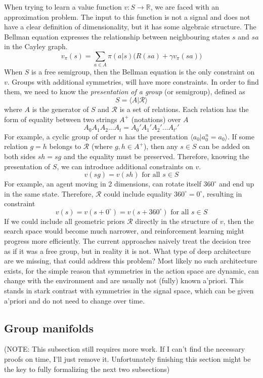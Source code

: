 \documentclass[12pt]{article}
\begin{document}
When trying to learn a value function $v:S\rightarrow \mathbb{R}$, we are faced with an approximation problem. The input to this function is not a signal and does not have a clear definition of dimensionality, but it has some algebraic structure.  The Bellman equation expresses the relationship between neighbouring states $s$ and $sa$ in the Cayley graph.
\[
v_\pi(s) = \sum_{a\in A} \pi(a|s)\big(R(sa)+\gamma v_\pi(sa)\big)
\]
When $S$ is a free semigroup, then the Bellman equation is the only constraint on $v$.
Groups with additional symmetries, will have more constraints. In order to find them, we need to know the \textit{presentation of a group} (or semigroup), defined as
\[
S = \langle A \vert \mathcal{R} \rangle
\]
where $A$ is the generator of $S$ and $\mathcal{R}$ is a set of relations. Each relation has the form of equality between two strings $A^+$ (notations) over $A$
\[
A_0A_1A_2...A_t = A_0'A_1'A_2'...A_{t'}'
\]
For example, a cyclic  group of order $n$ has the presentation $\langle a_0 \vert a_0^n=a_0 \rangle$. If some relation $g=h$ belongs to $\mathcal{R}$ (where $g,h\in A^+$), then any $s\in S$ can be added on both sides $sh=sg$ and the equality must be preserved.  Therefore, knowing the presentation of $S$, we can introduce additional constraints on $v$.  
\[
v(sg) = v(sh) \text{ for all }s\in S 
\]
For example, an agent moving in 2 dimensions, can rotate itself $360^\circ$ and end up in the same state. Therefore, $\mathcal{R}$ could include equality $360^\circ=0^\circ$, resulting in constraint
\[
v(s) = v(s+0^\circ) = v(s+360^\circ) \text{ for all }s\in S
\]
If we could include all geometric priors $\mathcal{R}$ directly in the structure of $v$, then the search space would become much narrower, and reinforcement learning might progress more efficiently. The current approaches naively treat the decision tree as if it was a free group, but in reality it is not. What type of deep architecture are we missing, that could address this problem? Most likely no such architecture exists, for the simple reason that symmetries in the action space are dynamic, can change with the environment and are usually not (fully) known a'priori. This stands in stark contrast with symmetries in the signal space, which can be given a'priori and do not need to change over time.

\subsection{Group manifolds}

(NOTE: This subsection still requires more work. If I can't find the necessary proofs on time, I'll just remove it. Unfortunately finishing this section might be the key to fully formalizing the next two subsections)
\end{document}
